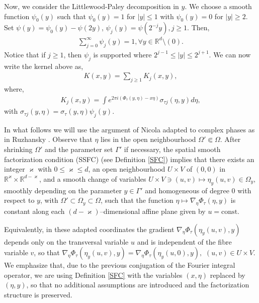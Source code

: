 \documentclass[12pt, reqno]{amsart}
\theoremstyle{definition}
\theoremstyle{remark}
\numberwithin{equation}{section}
\begin{document}
    Now, we consider the Littlewood-Paley decomposition in $y$. We choose a smooth function $\psi_0(y)$ such that $\psi_0(y)=1$ for $|y|\le 1$ with $\psi_0(y)=0$ for $|y|\ge 2$. Set $\psi(y)=\psi_0(y)-\psi(2y)$, $\psi_j(y)=\psi(2^{-j}y), j\ge 1.$ Then,
    \begin{align*}
        \sum_{j=0}^{\infty}\psi_j(y)=1, \forall y \in \mathbb{R}^d\setminus(0).
    \end{align*}
 Notice that if $j\ge 1$, then $\psi_j$ is supported where $2^{j-1}\le |y| \le 2^{j+1} $.
    We can now write the kernel above as,
    \begin{align*}
        K(x,y)=\sum_{j\ge 1}K_j(x,y), 
    \end{align*}
    where,
       \begin{align} K_j(x,y)=\displaystyle{\int} e^{2\pi i(\Phi_{\tau }(y,\eta)-x\eta)}\sigma_{\tau j}(\eta,y)d\eta,\end{align}
    with $\sigma_{\tau j}(y,\eta)=\sigma_{\tau}(y,\eta)\psi_j(y).$ 

    In what follows we will use the argument of Nicola \cite{Nicola2010} adapted to complex phases as in Ruzhansky \cite[Page 47]{Ruz2001}. 
    Observe that $\eta$ lies in the open neighbourhood $\Omega' \Subset \Omega$. After shrinking $\Omega'$ and the parameter set $\Gamma'$ if necessary, the spatial smooth factorization condition (SSFC) (see Definition \ref{SFC}) implies that there exists an integer $\varkappa$ with $0 \le \varkappa\le d$, an open neighbourhood $U \times V$ of $(0,0)$ in $\mathbb{R}^\varkappa \times \mathbb{R}^{d-\varkappa}$, and a smooth change of variables
$U \times V \ni (u,v) \longmapsto \eta_y(u,v) \in \Omega_y, 
$ smoothly depending on the parameter $y \in \Gamma'$ and homogeneous of degree $0$ with respect to $y$, with $\Omega' \subset \Omega_y \subset \Omega$, such that the function $\eta \mapsto \nabla_\eta \Phi_\tau(\eta,y)$ is constant along each $(d-\varkappa)$--dimensional affine plane given by $u=\mathrm{const}$. 

Equivalently, in these adapted coordinates the gradient $\nabla_\eta \Phi_\tau(\eta_y(u,v),y)$ depends only on the transversal variable $u$ and is independent of the fibre variable $v$, so that
$\nabla_\eta \Phi_\tau(\eta_y(u,v),y)=\nabla_\eta \Phi_\tau(\eta_y(u,0),y),\, \,(u,v)\in U\times V$. We emphasize that, due to the previous conjugation of the Fourier integral operator, we are using Definition \ref{SFC}  with the variables $(x,\eta)$ replaced by $(\eta,y)$, so that no additional assumptions are introduced and the factorization structure is preserved.
\end{document}
